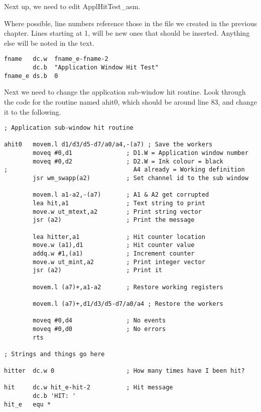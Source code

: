 Next up, we need to edit ApplHitTest\_asm. 

\begin{note}
Where possible, line numbers reference those in the file we created in the previous chapter. Lines starting at 1, will be new ones that should be inserted. Anything else will be noted in the text.
\end{note}

\begin{lstlisting}[firstnumber=5,caption={ApplTest\_asm - New Job Name}]
fname   dc.w  fname_e-fname-2
        dc.b  "Application Window Hit Test"
fname_e ds.b  0
\end{lstlisting}

Next we need to change the application sub-{}window hit routine. Look through
        the code for the routine named ahit0, which should be around line 83, and change it to the following.

\begin{lstlisting}[firstnumber=83,caption={ApplTest\_asm - New Application Window HIT Routine}]
; Application sub-window hit routine

ahit0   movem.l d1/d3/d5-d7/a0/a4,-(a7) ; Save the workers
        moveq #0,d1               ; D1.W = Application window number
        moveq #0,d2               ; D2.W = Ink colour = black
;                                   A4 already = Working definition
        jsr wm_swapp(a2)          ; Set channel id to the sub window

        movem.l a1-a2,-(a7)       ; A1 & A2 get corrupted
        lea hit,a1                ; Text string to print
        move.w ut_mtext,a2        ; Print string vector
        jsr (a2)                  ; Print the message

        lea hitter,a1             ; Hit counter location
        move.w (a1),d1            ; Hit counter value
        addq.w #1,(a1)            ; Increment counter
        move.w ut_mint,a2         ; Print integer vector
        jsr (a2)                  ; Print it

        movem.l (a7)+,a1-a2       ; Restore working registers

        movem.l (a7)+,d1/d3/d5-d7/a0/a4 ; Restore the workers

        moveq #0,d4               ; No events
        moveq #0,d0               ; No errors
        rts

; Strings and things go here

hitter  dc.w 0                    ; How many times have I been hit?

hit     dc.w hit_e-hit-2          ; Hit message
        dc.b 'HIT: '
hit_e   equ *
\end{lstlisting}

